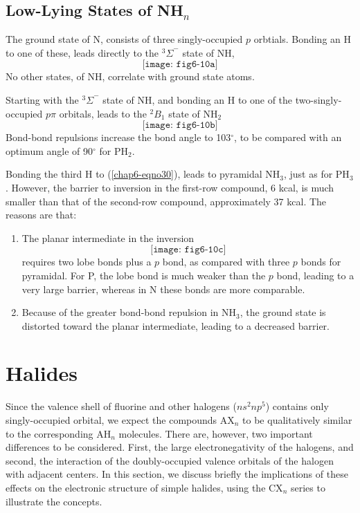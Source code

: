 \subsection{Low-Lying States of NH$_n$}

The ground state of N, consists of three singly-occupied $p$ 
orbtials.  Bonding an H to one of these, leads directly to the 
${^3\Sigma}^-$ state of NH,
\begin{equation}
\texttt{[image: fig6-10a]}
\end{equation}
No other states, of NH, correlate with ground state atoms.

Starting with the ${^3\Sigma}^-$ state of NH, and bonding an H to one
of the two-singly-occupied $p \pi$ orbitals, leads to the ${^2B}_1$
state of NH$_2$
\begin{equation}
\texttt{[image: fig6-10b]}
\end{equation}
Bond-bond repulsions increase the bond angle to 103$^{\circ}$, to be 
compared with an optimum angle of 90$^{\circ}$ for PH$_2$.

Bonding the third H to (\ref{chap6-eqno30}), leads to pyramidal
NH$_3$, just as for PH$_3$.  However, the barrier to inversion in the
first-row compound, 6 kcal, is much smaller than that of the
second-row compound, approximately 37 kcal.  The reasons are that:
\begin{enumerate} 
\item The planar intermediate in the inversion
\begin{equation}
\texttt{[image: fig6-10c]}
\end{equation}
requires two lobe bonds plus a $p$ bond, as compared with three $p$ 
bonds for pyramidal.  For P, the lobe bond is much weaker than the $p$ 
bond, leading to a very large barrier, whereas in N these bonds are 
more comparable.  

\item Because of the greater bond-bond 
repulsion in NH$_3$, the ground state is distorted toward the planar 
intermediate, leading to a decreased barrier.
\end{enumerate}
\section{Halides}

Since the valence shell of fluorine and other halogens ($ns^2np^5$) 
contains only singly-occupied orbital, we expect the compounds AX$_n$ 
to be qualitatively similar to the corresponding AH$_n$ molecules.  
There are, however, two important differences to be considered.  
First, the large electronegativity of the halogens, and second, the 
interaction of the doubly-occupied valence orbitals of the halogen 
with adjacent centers.  In this section, we discuss briefly the 
implications of these effects on the electronic structure of simple 
halides, using the CX$_n$ series to illustrate the concepts.

